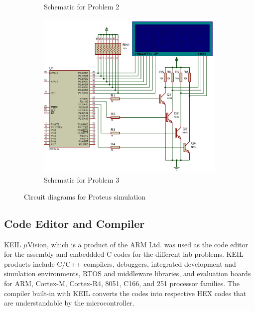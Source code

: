 \documentclass{lab_sheet}
\begin{document}
\begin{figure}[H]
\begin{subfigure}{.5\textwidth}
            \caption{Schematic for Problem 2}
            \label{fig:proteus_a}
        \end{subfigure}
        \hspace*{\fill}
      \begin{subfigure}{.5\textwidth}
        \centering
        \includegraphics[width=.9\linewidth]{../Figures/3_3}   
        \caption{Schematic for Problem 3}
        \label{fig:prob1-s}
      \end{subfigure}
      \hspace*{\fill}
        \caption{Circuit diagrams for Proteus simulation}
        \label{fig:proteus}
    \end{figure}
    \subsection{Code Editor and Compiler}
    KEIL $\mu$Vision, which is a product of the ARM Ltd. was used as the code editor for the assembly and embeddded C codes for the different lab problems. KEIL products include C/C++ compilers, debuggers, integrated development and simulation environments, RTOS and
    middleware libraries, and evaluation boards for ARM, Cortex-M, Cortex-R4, 8051, C166, and 251 processor families. The compiler built-in with KEIL converts the codes into respective HEX codes that are understandable by the microcontroller.
\end{document}

